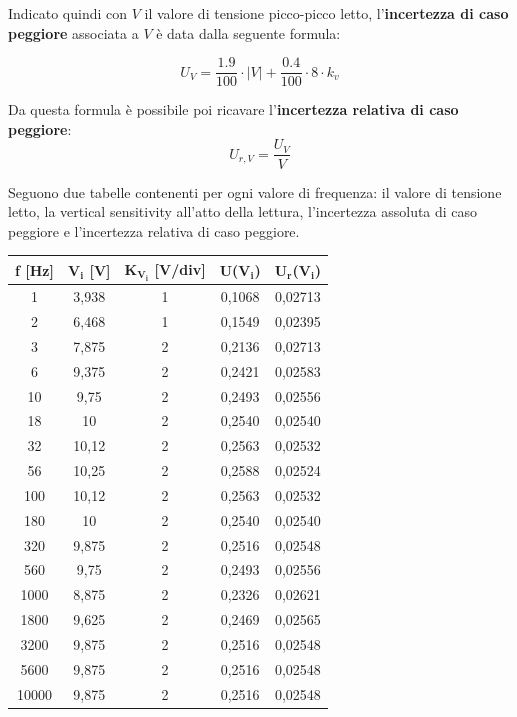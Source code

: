 Indicato quindi con $V$ il valore di tensione picco-picco letto, l'\textbf{incertezza di caso peggiore} associata a $V$ è data dalla seguente formula:

\[U_V = \frac{1.9}{100} \cdot |V| + \frac{0.4}{100} \cdot 8 \cdot k_v\]

Da questa formula è possibile poi ricavare l'\textbf{incertezza relativa di caso peggiore}:
\[U_{r,V} = \frac{U_V}{V}\]

Seguono due tabelle contenenti per ogni valore di frequenza: il valore di tensione letto, la vertical sensitivity all'atto della lettura, l'incertezza assoluta di caso peggiore e l'incertezza relativa di caso peggiore.

\begin{table}[!ht]
    \centering
    \begin{tabular}{|c|c|c|c|c|}
    \hline

        \textbf{f [Hz]} & \textbf{$\bm{V_{i}}$ [V]} & \textbf{$\bm{K_{V_i}}$ [V/div]} & \textbf{U($\bm{V_{i}}$)} & \textbf{$\bm{U_{r}}$($\bm{V_{i}}$)} \\ \hline

        1 & 3,938 & 1 & 0,1068 & 0,02713 \\ \hline
        2 & 6,468 & 1 & 0,1549 & 0,02395 \\ \hline
        3 & 7,875 & 2 & 0,2136 & 0,02713 \\ \hline
        6 & 9,375 & 2 & 0,2421 & 0,02583 \\ \hline
        10 & 9,75 & 2 & 0,2493 & 0,02556 \\ \hline
        18 & 10 & 2 & 0,2540 & 0,02540 \\ \hline
        32 & 10,12 & 2 & 0,2563 & 0,02532 \\ \hline
        56 & 10,25 & 2 & 0,2588 & 0,02524 \\ \hline
        100 & 10,12 & 2 & 0,2563 & 0,02532 \\ \hline
        180 & 10 & 2 & 0,2540 & 0,02540 \\ \hline
        320 & 9,875 & 2 & 0,2516 & 0,02548 \\ \hline
        560 & 9,75 & 2 & 0,2493 & 0,02556 \\ \hline
        1000 & 8,875 & 2 & 0,2326 & 0,02621 \\ \hline
        1800 & 9,625 & 2 & 0,2469 & 0,02565 \\ \hline
        3200 & 9,875 & 2 & 0,2516 & 0,02548 \\ \hline
        5600 & 9,875 & 2 & 0,2516 & 0,02548 \\ \hline
        10000 & 9,875 & 2 & 0,2516 & 0,02548 \\ \hline
    \end{tabular}
\end{table}

